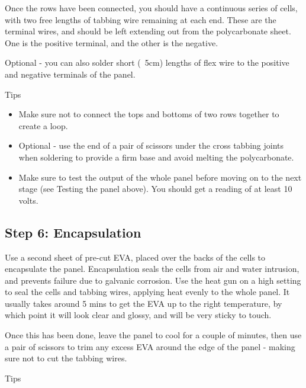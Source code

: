 \documentclass{article}
\theoremstyle{definition}
\theoremstyle{definition}
\theoremstyle{remark}
\begin{document}
    Once the rows have been connected, you should have a continuous series of cells, with two free lengths of tabbing wire remaining at each end. These are the terminal wires, and should be left extending out from the polycarbonate sheet. One is the positive terminal, and the other is the negative.

    Optional - you can also solder short (~5cm) lengths of flex wire to the positive and negative terminals of the panel.

    Tips

    \begin{itemize}
      \item Make sure not to connect the tops and bottoms of two rows together to create a loop. 
      \item Optional - use the end of a pair of scissors under the cross tabbing joints when soldering to provide a firm base and avoid melting the polycarbonate. 
      \item Make sure to test the output of the whole panel before moving on to the next stage (see Testing the panel above). You should get a reading of at least 10 volts.
    \end{itemize}


  \subsection{Step 6: Encapsulation} %
  \label{sub:step_6_encapsulation}

    Use a second sheet of pre-cut EVA, placed over the backs of the cells to encapsulate the panel. Encapsulation seals the cells from air and water intrusion, and prevents failure due to galvanic corrosion. Use the heat gun on a high setting to seal the cells and tabbing wires, applying heat evenly to the whole panel. It usually takes around 5 mins to get the EVA up to the right temperature, by which point it will look clear and glossy, and will be very sticky to touch.

    Once this has been done, leave the panel to cool for a couple of minutes, then use a pair of scissors to trim any excess EVA around the edge of the panel - making sure not to cut the tabbing wires.

    Tips
\end{document}
